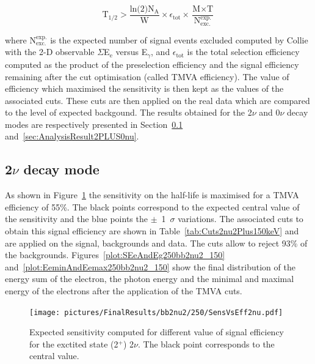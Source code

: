 \documentclass[main.tex]{subfiles}
\begin{document}
\begin{equation}\label{sec:SensitivityFormula}
\text{T}_{\text{1/2}} > \frac{\text{ln(2)} \text{N}_\text{A}}{\text{W}} \times \epsilon_{\text{tot}} \times \frac{\text{M} \times \text{T}}{\text{N}_{\text{exc.}}^{\text{exp.}}}
\end{equation}


\bigskip


\NI where $\text{N}_{\text{exc.}}^{\text{exp.}}$ is the expected number of signal events excluded computed by Collie with the 2-D observable $\Sigma$E$_\text{e}$ versus E$_{\gamma}$, and $\epsilon_{\text{tot}}$ is the total selection efficiency computed as the product of the preselection efficiency and the signal efficiency remaining after the cut optimisation (called TMVA efficiency). The value of efficiency which maximised the sensitivity is then kept as the values of the associated cuts. These cuts are then applied on the real data which are compared to the level of expected backgound. The results obtained for the 2$\nu$ and 0$\nu$ decay modes are respectively presented in Section~\ref{sec:AnalysisResult2PLUS2nu} and~\ref{sec:AnalysisResult2PLUS0nu}. 


\FloatBarrier


\subsection{2$\nu$ decay mode}\label{sec:AnalysisResult2PLUS2nu}


\NI As shown in Figure~\ref{plot:SensVsEff_150} the sensitivity on the half-life is maximised for a TMVA efficiency of 55\%.  The black points correspond to the expected central value of the sensitivity and the blue points the $\pm$~1~$\sigma$ variations. The associated cuts to obtain this signal efficiency are shown in Table~\ref{tab:Cuts2nu2Plus150keV} and are applied on the signal, backgrounds and data. The cuts allow to reject 93\% of the backgrounds. Figures~\ref{plot:SEeAndEg250bb2nu2_150} and~\ref{plot:EeminAndEemax250bb2nu2_150} show the final distribution of the energy sum of the electron, the photon energy and the minimal and maximal energy of the electrons after the application of the TMVA cuts.


\begin{figure} [h!]
\begin{center}
\texttt{[image: pictures/FinalResults/bb2nu2/250/SensVsEff2nu.pdf]}
\end{center}
\caption{Expected sensitivity computed for different value of signal efficiency for the exctited state (2$^+$) 2$\nu$. The black point corresponds to the central value.}
\label{plot:SensVsEff_150}
\end{figure}
\end{document}
